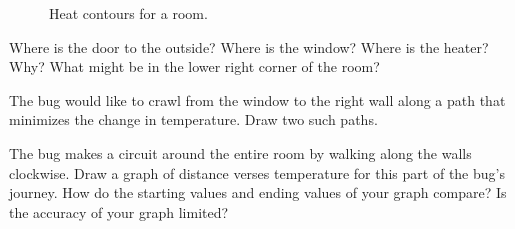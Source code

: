 \documentclass{problemset}
\begin{document}
\begin{figure}[h!]
\begin{center}
		\end{center}
		\vspace{-.5cm}
		\caption{Heat contours for a room.}
		\label{heatcontour1}
	\end{figure}
	\begin{parts}
		\item Where is the door to the outside?  Where is the window?  Where is the heater? Why?
			What might be in the lower right corner of the room?
		\item The bug would like to crawl from the window to the right wall along a path that minimizes
			the change in temperature.  Draw two such paths.
		\item The bug makes a circuit around the entire room by walking along the walls clockwise.
			Draw a graph of distance verses temperature for this part of the bug's journey.  How
			do the starting values and ending values of your graph compare?  Is the accuracy of your
			graph limited?
	\end{parts}
	
\end{document}
